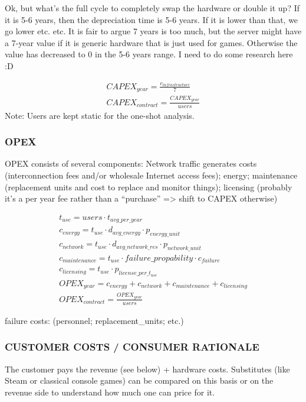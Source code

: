 Ok, but what's the full cycle to completely swap the hardware or double it up? If it is 5-6 years, then the depreciation time is 5-6 years. If it is lower than that, we go lower etc. etc. It is fair to argue 7 years is too much, but the server might have a 7-year value if it is generic hardware that is just used for games. Otherwise the value has decreased to 0 in the 5-6 years range. I need to do some research here :D

\begin{align*}
CAPEX_{year} = \frac{c_{infrastructure}}{7} \\
CAPEX_{contract} = \frac{CAPEX_{year}}{users}
\end{align*}
Note: Users are kept static for the one-shot analysis. 


\subsubsection{OPEX}

OPEX consists of several components: Network traffic generates costs (interconnection fees and/or wholesale Internet access fees); energy; maintenance (replacement units and cost to replace and monitor things); licensing (probably it's a per year fee rather than a ``purchase'' => shift to CAPEX otherwise)

\begin{align*}
t_{use} = users \cdot t_{avg\_per\_year} \\
c_{energy} = t_{use} \cdot d_{avg\_energy} \cdot p_{energy\_unit} \\
c_{network} = t_{use} \cdot d_{avg\_network\_res} \cdot p_{network\_unit} \\
c_{maintenance} = t_{use} \cdot failure\_propability \cdot c_{failure} \\
c_{licensing} = t_{use} \cdot p_{license\_per\_t_{use}} \\
OPEX_{year} = c_{energy} + c_{network} + c_{maintenance} + c_{licensing} \\
OPEX_{contract} = \frac{OPEX_{year}}{users}
\end{align*}

failure costs: (personnel; replacement\_units; etc.) 

\subsubsection{CUSTOMER COSTS / CONSUMER RATIONALE}

The customer pays the revenue (see below) + hardware costs. Substitutes (like Steam or classical console games) can be compared on this basis or on the revenue side to understand how much one can price for it.

